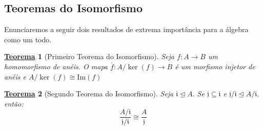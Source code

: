 \documentclass{article}
\newtheorem*{theorem*}{\underline{Teorema}}
\begin{document}
\subsection{Teoremas do Isomorfismo}
Enunciaremos a seguir dois resultados de extrema importância para a álgebra como um todo.
\hypertarget{first_isomorphism}{
  \begin{theorem*}[Primeiro Teorema do Isomorfismo]
    Seja \(f:A\rightarrow B\) um homomorfismo de anéis. O mapa \(\overline{f}:A/\ker{(f)}\rightarrow B\)
    é um morfismo injetor de anéis e \(A/\ker{(f)}\cong{\mathrm{Im}(f)}\)
\end{theorem*}}
\hypertarget{second_isomorphism}{
  \begin{theorem*}[Segundo Teorema do Isomorfismo]
    Seja \(\mathfrak{i}\trianglelefteq{A}.\) Se \(\mathfrak{j}\subseteq \mathfrak{i}\) e \(\mathfrak{j}/\mathfrak{i}\trianglelefteq{A/\mathfrak{i}},\) então:
    \[
      \frac{A/\mathfrak{i}}{\mathfrak{j}/\mathfrak{i}}\cong{\frac{A}{\mathfrak{j}}}
    \]
\end{theorem*}}
\end{document}
